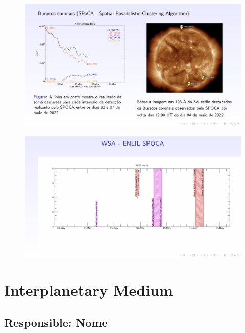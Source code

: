 \documentclass[a4paper, 10pt]{article}
\begin{document}
    \begin{figure}[H]
        \centering
        \includegraphics[width=14cm]{./figures/en_outfileSun_0.jpg}
    \end{figure} 
 

    
    \begin{figure}[H]
        \centering
        \includegraphics[width=14cm]{./figures/en_outfileSun_1.jpg}
    \end{figure} 
 

    \section{Interplanetary Medium} 
 \subsection{Responsible: Nome} 
 
\end{document}

